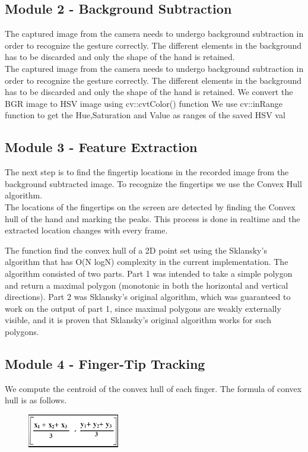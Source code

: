 \documentclass[11pt]{report}
\begin{document}
\subsection{Module 2 - Background Subtraction}
The captured image from the camera needs to undergo background subtraction in order to recognize the gesture correctly. 
The different elements in the background has to be discarded and only the shape of the hand is retained. 
\\
The captured image from the camera needs to undergo background subtraction in order to recognize the gesture correctly. The different elements in the background has to be discarded and only the shape of the hand is retained.  
We convert the BGR image to HSV image using cv::cvtColor() function
We use cv::inRange function to get the Hue,Saturation and Value as ranges of the saved HSV val
\subsection{Module 3 - Feature Extraction}
The next step is to find the fingertip locations in the recorded image from the background subtracted image.
To recognize the fingertips we use the Convex Hull algorithm. 
\\
The locations of the fingertips on the screen are detected by finding the Convex hull of the 
hand and marking the peaks. This process is done in realtime and the extracted location changes
 with every frame. 
 
 The function find the convex hull of a 2D point set using the Sklansky’s algorithm
 that has O(N logN) complexity in the current implementation. The algorithm consisted of two parts. 
 Part 1 was intended to take a simple polygon and return a maximal polygon (monotonic in both the 
 horizontal and vertical directions). Part 2 was Sklansky's original algorithm, which
 was guaranteed to work on the output of part 1, since maximal polygons are weakly externally visible,
 and it is proven that Sklansky's original algorithm works for such polygons.

\subsection{Module 4 - Finger-Tip Tracking}
We compute the centroid of the convex hull of each finger. The formula of convex hull is as follows.
\begin{center}
    
\begin{figure}[H]
    \includegraphics[width=4cm]{centroid.png}
\end{figure}
\end{center}
\end{document}
